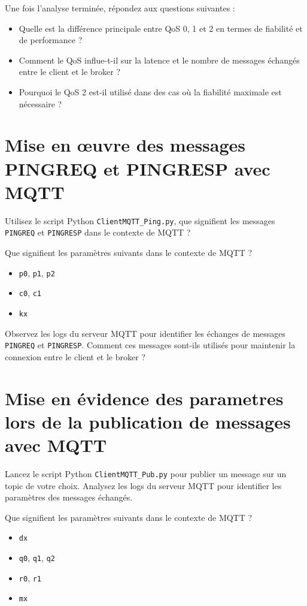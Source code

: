\documentclass{article}
\begin{document}
Une fois l'analyse terminée, répondez aux questions suivantes :
\begin{itemize}
    \item Quelle est la différence principale entre QoS 0, 1 et 2 en termes de fiabilité et de performance ?
    \item Comment le QoS influe-t-il sur la latence et le nombre de messages échangés entre le client et le broker ?
    \item Pourquoi le QoS 2 est-il utilisé dans des cas où la fiabilité maximale est nécessaire ?
\end{itemize}

\section{Mise en œuvre des messages PINGREQ et PINGRESP avec MQTT}

Utilisez le script Python \texttt{ClientMQTT\_Ping.py}, que signifient les messages \texttt{PINGREQ} et \texttt{PINGRESP} dans le contexte de MQTT ?

Que signifient les paramètres suivants dans le contexte de MQTT ?

\begin{itemize}
    \item \texttt{p0}, \texttt{p1}, \texttt{p2}
    \item \texttt{c0}, \texttt{c1}
    \item \texttt{kx}
\end{itemize}

Observez les logs du serveur MQTT pour identifier les échanges de messages \texttt{PINGREQ} et \texttt{PINGRESP}. Comment ces messages sont-ils utilisés pour maintenir la connexion entre le client et le broker ?



\section{Mise en évidence des parametres lors de la publication de messages avec MQTT}

Lancez le script Python \texttt{ClientMQTT\_Pub.py} pour publier un message sur un topic de votre choix. Analysez les logs du serveur MQTT pour identifier les paramètres des messages échangés.

Que signifient les paramètres suivants dans le contexte de MQTT ?

\begin{itemize}
    \item \texttt{dx}
    \item \texttt{q0}, \texttt{q1}, \texttt{q2}
    \item \texttt{r0}, \texttt{r1}
    \item \texttt{mx}
\end{itemize}
\end{document}
